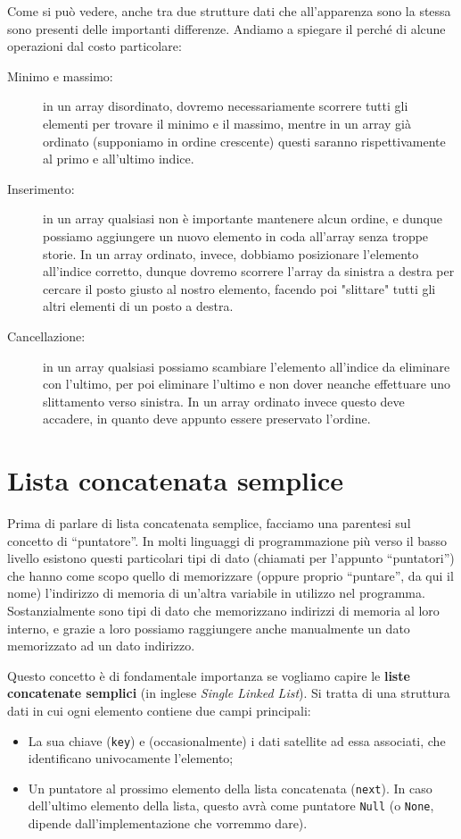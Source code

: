 \documentclass[12pt]{report}
\begin{document}
    Come si può vedere, anche tra due strutture dati che all'apparenza sono la stessa sono presenti delle importanti differenze.
    Andiamo a spiegare il perché di alcune operazioni dal costo particolare:
    \begin{description}
    	
    	\item [Minimo e massimo:] in un array disordinato, dovremo necessariamente scorrere tutti gli elementi per trovare il minimo e il massimo, mentre in un array già ordinato (supponiamo in ordine crescente) questi saranno rispettivamente al primo e all'ultimo indice.
    	
    	\item [Inserimento:] in un array qualsiasi non è importante mantenere alcun ordine, e dunque possiamo aggiungere un nuovo elemento in coda all'array senza troppe storie. In un array ordinato, invece, dobbiamo posizionare l'elemento all'indice corretto, dunque dovremo scorrere l'array da sinistra a destra per cercare il posto giusto al nostro elemento, facendo poi "slittare" tutti gli altri elementi di un posto a destra.
    	
    	\item [Cancellazione:] in un array qualsiasi possiamo scambiare l'elemento all'indice da eliminare con l'ultimo, per poi eliminare l'ultimo e non dover neanche effettuare uno slittamento verso sinistra. In un array ordinato invece questo deve accadere, in quanto deve appunto essere preservato l'ordine.
    	
    \end{description}
    
    \section{Lista concatenata semplice}
    Prima di parlare di lista concatenata semplice, facciamo una parentesi sul concetto di ``puntatore''.
    In molti linguaggi di programmazione più verso il basso livello esistono questi particolari tipi di dato (chiamati per l'appunto ``puntatori'') che hanno come scopo quello di memorizzare (oppure proprio ``puntare'', da qui il nome) l'indirizzo di memoria di un'altra variabile in utilizzo nel programma. Sostanzialmente sono tipi di dato che memorizzano indirizzi di memoria al loro interno, e grazie a loro possiamo raggiungere anche manualmente un dato memorizzato ad un dato indirizzo.
    
    Questo concetto è di fondamentale importanza se vogliamo capire le \textbf{liste concatenate semplici} (in inglese \textit{Single Linked List}). Si tratta di una struttura dati in cui ogni elemento contiene due campi principali:
    \begin{itemize}
    	\item La sua chiave (\texttt{key}) e (occasionalmente) i dati satellite ad essa associati, che identificano univocamente l'elemento;
    	\item Un puntatore al prossimo elemento della lista concatenata (\texttt{next}). In caso dell'ultimo elemento della lista, questo avrà come puntatore \texttt{Null} (o \texttt{None}, dipende dall'implementazione che vorremmo dare).
    \end{itemize}
    
\end{document}
